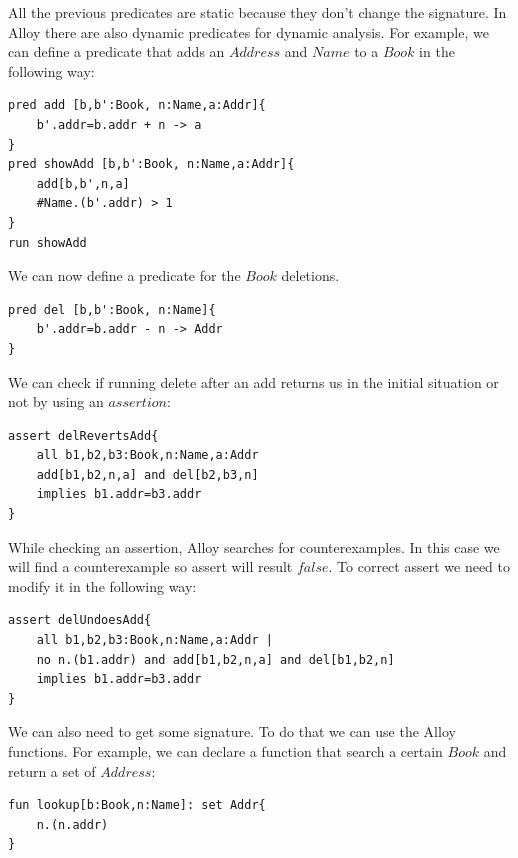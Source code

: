 \documentclass[12pt, a4paper]{report}
\begin{document}
        All the previous predicates are static because they don't change the signature. In Alloy there are also dynamic predicates for dynamic analysis. For example, we can define a 
        predicate that adds an $Address$ and $Name$ to a $Book$ in the following way: 
        \begin{lstlisting}[language=alloy]
pred add [b,b':Book, n:Name,a:Addr]{
    b'.addr=b.addr + n -> a
}
pred showAdd [b,b':Book, n:Name,a:Addr]{
    add[b,b',n,a]
    #Name.(b'.addr) > 1
}
run showAdd
        \end{lstlisting}
        We can now define a predicate for the $Book$ deletions.  
        \begin{lstlisting}[language=alloy]
pred del [b,b':Book, n:Name]{
    b'.addr=b.addr - n -> Addr
}
        \end{lstlisting}
        We can check if running delete after an add returns us in the initial situation or not by using an $assertion$:
        \begin{lstlisting}[language=alloy]
assert delRevertsAdd{
    all b1,b2,b3:Book,n:Name,a:Addr
    add[b1,b2,n,a] and del[b2,b3,n]
    implies b1.addr=b3.addr
}
        \end{lstlisting}
        While checking an assertion, Alloy searches for counterexamples. In this case we will find a counterexample so assert will result $false$. To correct assert we need to 
        modify it in the following way: 
        \begin{lstlisting}[language=alloy]
assert delUndoesAdd{
    all b1,b2,b3:Book,n:Name,a:Addr |
    no n.(b1.addr) and add[b1,b2,n,a] and del[b1,b2,n]
    implies b1.addr=b3.addr
}
        \end{lstlisting}
        We can also need to get some signature. To do that we can use the Alloy functions. For example, we can declare a function that search a certain $Book$ and return a set of $Address$:
        \begin{lstlisting}[language=alloy]
fun lookup[b:Book,n:Name]: set Addr{
    n.(n.addr)
}
        \end{lstlisting}
    
\end{document}

